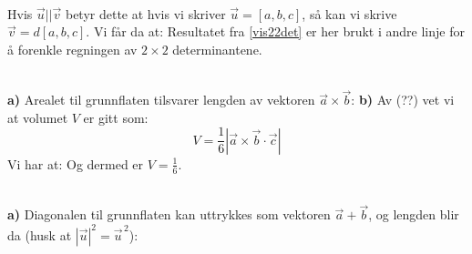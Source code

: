 \\
Hvis $ \vec{u}||\vec{v} $ betyr dette at hvis vi skriver $ \vec{u}=[a, b, c] $, så kan vi skrive $ \vec{v}=d[a, b, c] $. Vi får da at:
Resultatet fra \ref{vis22det} er her brukt i andre linje for å forenkle regningen av $ 2\times2 $ determinantene.

\\
\textbf{a)} Arealet til grunnflaten tilsvarer lengden av vektoren $ \vec{a}\times\vec{b} $:
\textbf{b)} Av (??) vet vi at volumet $ V $ er gitt som:
\[ V = \frac{1}{6}|\vec{a}\times\vec{b} \cdot \vec{c}| \]
Vi har at:
Og dermed er $ V=\frac{1}{6} $.

\\
\textbf{a)} Diagonalen til grunnflaten kan uttrykkes som vektoren $ \vec{a}+\vec{b} $, og lengden blir da (husk at $ |\vec{u}|^2 = \vec{u}^{\,2} $):
